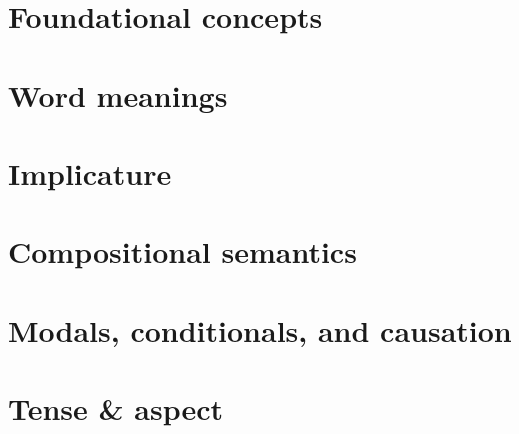 \documentclass[output=book,
  nonflat,
  modfonts,
  colorlinks,citecolor=brown,
  showindex,
		  ]{langsci/langscibook}
\begin{document}
 
 
 
 

\maketitle                
\frontmatter

\tableofcontents
 
% 
%  
\mainmatter     
 

\part{Foundational concepts}\label{unit:1}

  \setcounter{equation}{0}




\part{Word meanings}\label{unit:2}




\part{Implicature} \label{unit:3}





\part{Compositional semantics} \label{unit:4}





\part{Modals, conditionals, and causation} \label{unit:5}





\part{Tense \& aspect} \label{unit:6}



 


\sloppy
 
 
\end{document}
